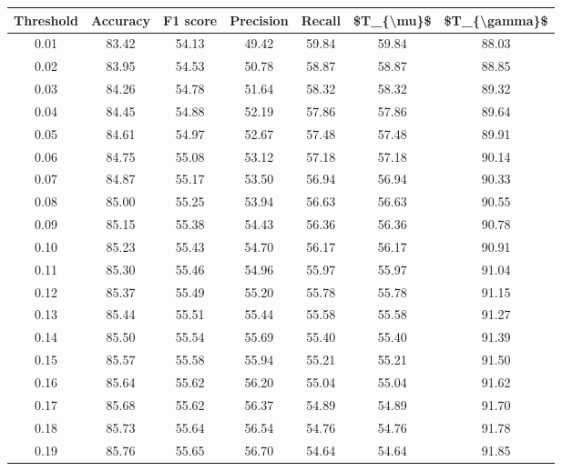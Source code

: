 \begin{tabular}{|c|c|c|c|c|c|c|}
\hline
 Threshold &  Accuracy &  F1 score &  Precision &  Recall &  \$T\_\{\textbackslash mu\}\$ &  \$T\_\{\textbackslash gamma\}\$ \\
\hline
      0.01 &     83.42 &     54.13 &      49.42 &   59.84 &      59.84 &         88.03 \\
      0.02 &     83.95 &     54.53 &      50.78 &   58.87 &      58.87 &         88.85 \\
      0.03 &     84.26 &     54.78 &      51.64 &   58.32 &      58.32 &         89.32 \\
      0.04 &     84.45 &     54.88 &      52.19 &   57.86 &      57.86 &         89.64 \\
      0.05 &     84.61 &     54.97 &      52.67 &   57.48 &      57.48 &         89.91 \\
      0.06 &     84.75 &     55.08 &      53.12 &   57.18 &      57.18 &         90.14 \\
      0.07 &     84.87 &     55.17 &      53.50 &   56.94 &      56.94 &         90.33 \\
      0.08 &     85.00 &     55.25 &      53.94 &   56.63 &      56.63 &         90.55 \\
      0.09 &     85.15 &     55.38 &      54.43 &   56.36 &      56.36 &         90.78 \\
      0.10 &     85.23 &     55.43 &      54.70 &   56.17 &      56.17 &         90.91 \\
      0.11 &     85.30 &     55.46 &      54.96 &   55.97 &      55.97 &         91.04 \\
      0.12 &     85.37 &     55.49 &      55.20 &   55.78 &      55.78 &         91.15 \\
      0.13 &     85.44 &     55.51 &      55.44 &   55.58 &      55.58 &         91.27 \\
      0.14 &     85.50 &     55.54 &      55.69 &   55.40 &      55.40 &         91.39 \\
      0.15 &     85.57 &     55.58 &      55.94 &   55.21 &      55.21 &         91.50 \\
      0.16 &     85.64 &     55.62 &      56.20 &   55.04 &      55.04 &         91.62 \\
      0.17 &     85.68 &     55.62 &      56.37 &   54.89 &      54.89 &         91.70 \\
      0.18 &     85.73 &     55.64 &      56.54 &   54.76 &      54.76 &         91.78 \\
      0.19 &     85.76 &     55.65 &      56.70 &   54.64 &      54.64 &         91.85 \\

\end{tabular}
